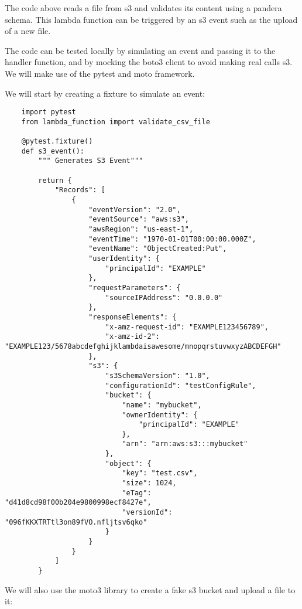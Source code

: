 \documentclass{article}
\begin{document}
The code above reads a file from s3 and validates its content using a pandera schema. This lambda function can be triggered by an s3 event such as the upload of a new file.

The code can be tested locally by simulating an event and passing it to the handler function, and by mocking the boto3 client to avoid making real calls s3. We will make use of the pytest and moto framework.

We will start by creating a fixture to simulate an event:

\begin{verbatim}
    import pytest
    from lambda_function import validate_csv_file

    @pytest.fixture()
    def s3_event():
        """ Generates S3 Event"""

        return {
            "Records": [
                {
                    "eventVersion": "2.0",
                    "eventSource": "aws:s3",
                    "awsRegion": "us-east-1",
                    "eventTime": "1970-01-01T00:00:00.000Z",
                    "eventName": "ObjectCreated:Put",
                    "userIdentity": {
                        "principalId": "EXAMPLE"
                    },
                    "requestParameters": {
                        "sourceIPAddress": "0.0.0.0"
                    },
                    "responseElements": {
                        "x-amz-request-id": "EXAMPLE123456789",
                        "x-amz-id-2": "EXAMPLE123/5678abcdefghijklambdaisawesome/mnopqrstuvwxyzABCDEFGH"
                    },
                    "s3": {
                        "s3SchemaVersion": "1.0",
                        "configurationId": "testConfigRule",
                        "bucket": {
                            "name": "mybucket",
                            "ownerIdentity": {
                                "principalId": "EXAMPLE"
                            },
                            "arn": "arn:aws:s3:::mybucket"
                        },
                        "object": {
                            "key": "test.csv",
                            "size": 1024,
                            "eTag": "d41d8cd98f00b204e9800998ecf8427e",
                            "versionId": "096fKKXTRTtl3on89fVO.nfljtsv6qko"
                        }
                    }
                }
            ]
        }
\end{verbatim}

We will also use the moto3 library to create a fake s3 bucket and upload a file to it:
\end{document}
